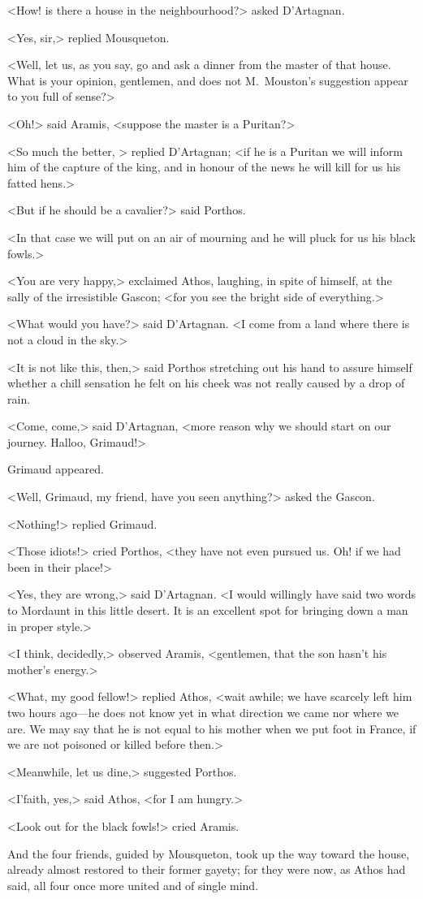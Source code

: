 <How! is there a house in the neighbourhood?> asked D'Artagnan.

<Yes, sir,> replied Mousqueton.

<Well, let us, as you say, go and ask a dinner from the master of that house. What is your opinion, gentlemen, and does not M.~Mouston's suggestion appear to you full of sense?>

<Oh!> said Aramis, <suppose the master is a Puritan?>

<So much the better, > replied D'Artagnan; <if he is a Puritan we will inform him of the capture of the king, and in honour of the news he will kill for us his fatted hens.>

<But if he should be a cavalier?> said Porthos.

<In that case we will put on an air of mourning and he will pluck for us his black fowls.>

<You are very happy,> exclaimed Athos, laughing, in spite of himself, at the sally of the irresistible Gascon; <for you see the bright side of everything.>

<What would you have?> said D'Artagnan. <I come from a land where there is not a cloud in the sky.>

<It is not like this, then,> said Porthos stretching out his hand to assure himself whether a chill sensation he felt on his cheek was not really caused by a drop of rain.

<Come, come,> said D'Artagnan, <more reason why we should start on our journey. Halloo, Grimaud!>

Grimaud appeared.

<Well, Grimaud, my friend, have you seen anything?> asked the Gascon.

<Nothing!> replied Grimaud.

<Those idiots!> cried Porthos, <they have not even pursued us. Oh! if we had been in their place!>

<Yes, they are wrong,> said D'Artagnan. <I would willingly have said two words to Mordaunt in this little desert. It is an excellent spot for bringing down a man in proper style.>

<I think, decidedly,> observed Aramis, <gentlemen, that the son hasn't his mother's energy.>

<What, my good fellow!> replied Athos, <wait awhile; we have scarcely left him two hours ago—he does not know yet in what direction we came nor where we are. We may say that he is not equal to his mother when we put foot in France, if we are not poisoned or killed before then.>

<Meanwhile, let us dine,> suggested Porthos.

<I'faith, yes,> said Athos, <for I am hungry.>

<Look out for the black fowls!> cried Aramis.

And the four friends, guided by Mousqueton, took up the way toward the house, already almost restored to their former gayety; for they were now, as Athos had said, all four once more united and of single mind. 